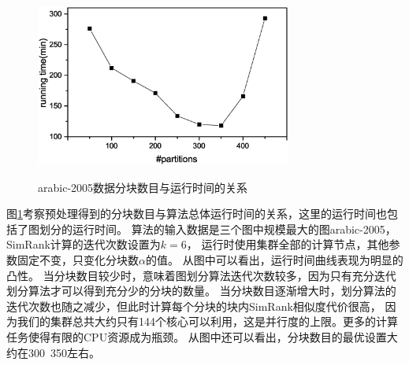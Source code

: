 \documentclass[master]{njuthesis}
\begin{document}
\begin{figure}[h]
  \centering
  \includegraphics[width= 0.75\textwidth]{figure/ch3_partition_time.eps}\\
  \caption{arabic-2005数据分块数目与运行时间的关系}
  \label{fig:ch3_partition_time}
\end{figure}

图\ref{fig:ch3_partition_time}考察预处理得到的分块数目与算法总体运行时间的关系，这里的运行时间也包括了图划分的运行时间。
算法的输入数据是三个图中规模最大的图arabic-2005，SimRank计算的迭代次数设置为$k=6$，
运行时使用集群全部的计算节点，其他参数固定不变，只变化分块数$\alpha$的值。
从图中可以看出，运行时间曲线表现为明显的凸性。
当分块数目较少时，意味着图划分算法迭代次数较多，因为只有充分迭代划分算法才可以得到充分少的分块的数量。
当分块数目逐渐增大时，划分算法的迭代次数也随之减少，但此时计算每个分块的块内SimRank相似度代价很高，
因为我们的集群总共大约只有144个核心可以利用，这是并行度的上限。更多的计算任务使得有限的CPU资源成为瓶颈。
从图中还可以看出，分块数目的最优设置大约在300~350左右。
\end{document}
